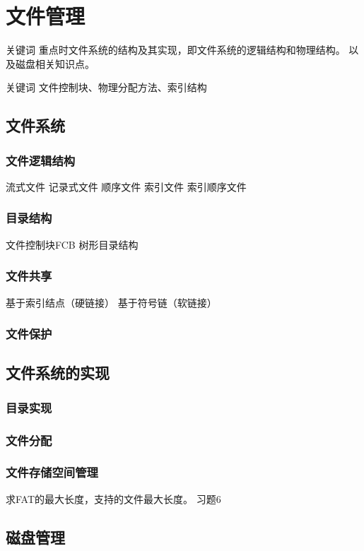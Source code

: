 \chapter{文件管理}
关键词
重点时文件系统的结构及其实现，即文件系统的逻辑结构和物理结构。
以及磁盘相关知识点。

关键词
文件控制块、物理分配方法、索引结构


\section{文件系统}
\subsection{文件逻辑结构}
流式文件
记录式文件 顺序文件 索引文件 索引顺序文件

\subsection{目录结构}
文件控制块FCB
树形目录结构


\subsection{文件共享}
基于索引结点（硬链接）
基于符号链（软链接）


\subsection{文件保护}


\section{文件系统的实现}
\subsection{目录实现}
\subsection{文件分配}
\subsection{文件存储空间管理}

求FAT的最大长度，支持的文件最大长度。
习题6 

\section{磁盘管理}
